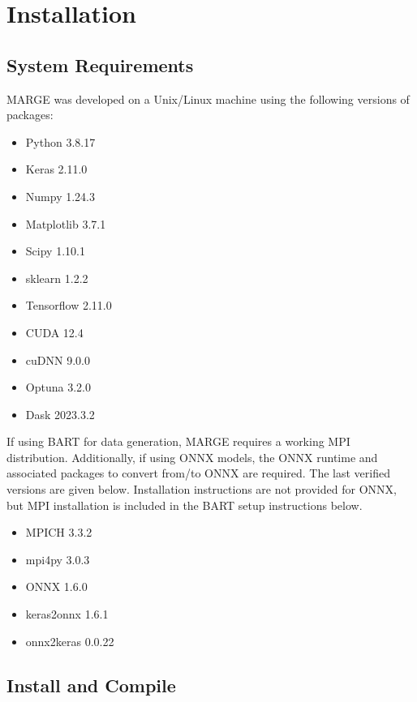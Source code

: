 \documentclass[letterpaper, 12pt]{article}
\begin{document}
\section{Installation}
\label{sec:installation}

\subsection{System Requirements}
\label{sec:requirements}

\noindent MARGE was developed on a Unix/Linux machine using the following 
versions of packages:

\begin{itemize}
\item Python 3.8.17
\item Keras 2.11.0
\item Numpy 1.24.3
\item Matplotlib 3.7.1
\item Scipy 1.10.1
\item sklearn 1.2.2
\item Tensorflow 2.11.0
\item CUDA 12.4
\item cuDNN 9.0.0
\item Optuna 3.2.0
\item Dask 2023.3.2
\end{itemize}

\noindent If using BART for data generation, MARGE requires a working MPI 
distribution.  Additionally, if using ONNX models, the ONNX runtime and 
associated packages to convert from/to ONNX are required.  The last verified 
versions are given below.  Installation instructions are not provided for ONNX, 
but MPI installation is included in the BART setup instructions below.

\begin{itemize}
	\item MPICH 3.3.2
	\item mpi4py 3.0.3
	\item ONNX 1.6.0
	\item keras2onnx 1.6.1
	\item onnx2keras 0.0.22
\end{itemize}



\subsection{Install and Compile}
\label{sec:install}
\end{document}

